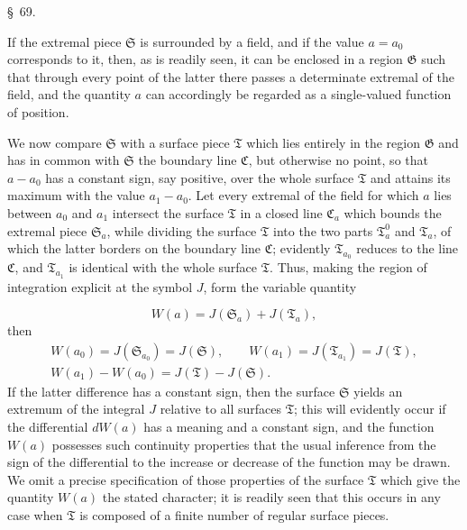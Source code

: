 \documentclass[11pt,a4paper,leqno]{article}
\begin{document}

\begin{center}
{\large \S~69.}
\end{center}

If the extremal piece $\mathfrak{S}$ is surrounded by a field, and if the
value $a=a_0$ corresponds to it, then, as is readily seen, it can be enclosed
in a region $\mathfrak{G}$ such that through every point of the latter there
passes a determinate extremal of the field, and the quantity $a$ can
accordingly be regarded as a single-valued function of position.

We now compare $\mathfrak{S}$ with a surface piece $\mathfrak{T}$ which lies
entirely in the region $\mathfrak{G}$ and has in common with $\mathfrak{S}$
the boundary line $\mathfrak{C}$, but otherwise no point, so that $a-a_0$ has
a constant sign, say positive, over the whole surface $\mathfrak{T}$ and
attains its maximum with the value $a_1-a_0$. Let every extremal of the field
for which $a$ lies between $a_0$ and $a_1$ intersect the surface
$\mathfrak{T}$ in a closed line $\mathfrak{C}_a$ which bounds the extremal
piece $\mathfrak{S}_a$, while dividing the surface $\mathfrak{T}$ into the
two parts $\mathfrak{T}_a^0$ and $\mathfrak{T}_a$, of which the latter borders
on the boundary line $\mathfrak{C}$; evidently $\mathfrak{T}_{a_0}$ reduces
to the line $\mathfrak{C}$, and $\mathfrak{T}_{a_1}$ is identical with the
whole surface $\mathfrak{T}$. Thus, making the region of integration explicit
at the symbol $J$, form the variable quantity

\[
W(a)=J(\mathfrak{S}_a)+J(\mathfrak{T}_a),
\]
then
\[
\begin{gathered}
W(a_0)=J(\mathfrak{S}_{a_0})=J(\mathfrak{S}),\qquad
W(a_1)=J(\mathfrak{T}_{a_1})=J(\mathfrak{T}),\\
W(a_1)-W(a_0)=J(\mathfrak{T})-J(\mathfrak{S}).
\end{gathered}
\]
If the latter difference has a constant sign, then the surface
$\mathfrak{S}$ yields an extremum of the integral $J$ relative to all
surfaces $\mathfrak{T}$; this will evidently occur if the differential
$dW(a)$ has a meaning and a constant sign, and the function $W(a)$ possesses
such continuity properties that the usual inference from the sign of the
differential to the increase or decrease of the function may be drawn. We
omit a precise specification of those properties of the surface
$\mathfrak{T}$ which give the quantity $W(a)$ the stated character; it is
readily seen that this occurs in any case when $\mathfrak{T}$ is composed of
a finite number of regular surface pieces.
\end{document}
